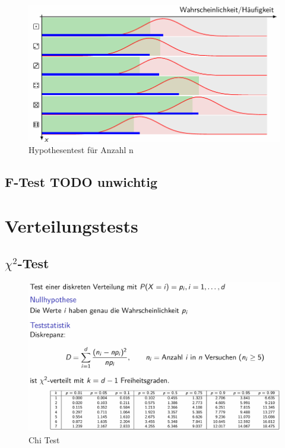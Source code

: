 \documentclass[../Main.tex]{subfiles}
\begin{document}
\begin{figure}[H]
    \centering
    \includegraphics[width=1\linewidth]{Images/hyp-n-anzahl.png}
    \caption{Hypothesentest für Anzahl n}
\end{figure}

\subsection{F-Test TODO unwichtig}

\section{Verteilungstests}
\subsection{\(\chi^2\)-Test}

\begin{figure}[H]
    \centering
    \includegraphics[width=1\linewidth]{Images/x-text.png}
    \caption{Chi Test}
\end{figure}
\end{document}

